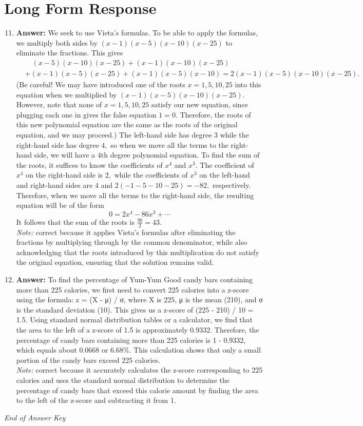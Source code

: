\documentclass[12pt]{article}
\begin{document}
\section*{Long Form Response}
\begin{enumerate}[label=\arabic*.]
\setcounter{enumi}{10}
\item \textbf{Answer:} We seek to use Vieta's formulas. To be able to apply the formulas, we multiply both sides by $(x-1)(x-5)(x-10)(x-25)$ to eliminate the fractions. This gives \[\begin{aligned}&\quad (x-5)(x-10)(x-25) + (x-1)(x-10)(x-25) \\& + (x-1)(x-5)(x-25) + (x-1)(x-5)(x-10) = 2(x-1)(x-5)(x-10)(x-25). \end{aligned}\](Be careful! We may have introduced one of the roots $x = 1, 5, 10, 25$ into this equation when we multiplied by $(x-1)(x-5)(x-10)(x-25).$ However, note that none of $x = 1, 5, 10, 25$ satisfy our new equation, since plugging each one in gives the false equation $1=0.$ Therefore, the roots of this new polynomial equation are the same as the roots of the original equation, and we may proceed.) The left-hand side has degree $3$ while the right-hand side has degree $4,$ so when we move all the terms to the right-hand side, we will have a $4$th degree polynomial equation. To find the sum of the roots, it suffices to know the coefficients of $x^4$ and $x^3.$ The coefficient of $x^4$ on the right-hand side is $2,$ while the coefficients of $x^3$ on the left-hand and right-hand sides are $4$ and $2(-1-5-10-25) = -82,$ respectively. Therefore, when we move all the terms to the right-hand side, the resulting equation will be of the form \[ 0 = 2 x^4 - 86 x^3 + \cdots\]It follows that the sum of the roots is $\tfrac{86}{2} = \boxed{43}.$
\\ \textit{Note:} correct because it applies Vieta's formulas after eliminating the fractions by multiplying through by the common denominator, while also acknowledging that the roots introduced by this multiplication do not satisfy the original equation, ensuring that the solution remains valid.
\item \textbf{Answer:} To find the percentage of Yum-Yum Good candy bars containing more than 225 calories, we first need to convert 225 calories into a z-score using the formula: z = (X - μ) / σ, where X is 225, μ is the mean (210), and σ is the standard deviation (10). This gives us a z-score of (225 - 210) / 10 = 1.5. Using standard normal distribution tables or a calculator, we find that the area to the left of a z-score of 1.5 is approximately 0.9332. Therefore, the percentage of candy bars containing more than 225 calories is 1 - 0.9332, which equals about 0.0668 or 6.68\%. This calculation shows that only a small portion of the candy bars exceed 225 calories.
\\ \textit{Note:} correct because it accurately calculates the z-score corresponding to 225 calories and uses the standard normal distribution to determine the percentage of candy bars that exceed this calorie amount by finding the area to the left of the z-score and subtracting it from 1.
\end{enumerate}

\vfill
\noindent\textit{End of Answer Key}
\end{document}
